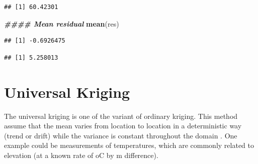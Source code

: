 \documentclass[
]{book}
\newenvironment{Shaded}{\begin{snugshade}}{\end{snugshade}}
\newcommand{\AttributeTok}[1]{\textcolor[rgb]{0.13,0.29,0.53}{#1}}
\newcommand{\ConstantTok}[1]{\textcolor[rgb]{0.56,0.35,0.01}{#1}}
\newcommand{\DecValTok}[1]{\textcolor[rgb]{0.00,0.00,0.81}{#1}}
\newcommand{\DocumentationTok}[1]{\textcolor[rgb]{0.56,0.35,0.01}{\textbf{\textit{#1}}}}
\newcommand{\FunctionTok}[1]{\textcolor[rgb]{0.13,0.29,0.53}{\textbf{#1}}}
\newcommand{\NormalTok}[1]{#1}
\newcommand{\OtherTok}[1]{\textcolor[rgb]{0.56,0.35,0.01}{#1}}
\newcommand{\SpecialCharTok}[1]{\textcolor[rgb]{0.81,0.36,0.00}{\textbf{#1}}}
\begin{document}
\begin{Shaded}
\end{Shaded}

\begin{verbatim}
## [1] 60.42301
\end{verbatim}

\begin{Shaded}
\begin{Highlighting}[]
\DocumentationTok{\#\#\#\# Mean residual}
\FunctionTok{mean}\NormalTok{(res)}
\end{Highlighting}
\end{Shaded}

\begin{verbatim}
## [1] -0.6926475
\end{verbatim}

\begin{Shaded}
\end{Shaded}

\begin{verbatim}
## [1] 5.258013
\end{verbatim}

\hypertarget{universal-kriging}{%
\section{Universal Kriging}\label{universal-kriging}}

The universal kriging is one of the variant of ordinary kriging. This method assume that the mean varies from location to location in a deterministic way (trend or drift) while the variance is constant throughout the domain \citep{matheron_traite_1962}. One example could be measurements of temperatures, which are commonly related to elevation (at a known rate of oC by m difference).
\end{document}

